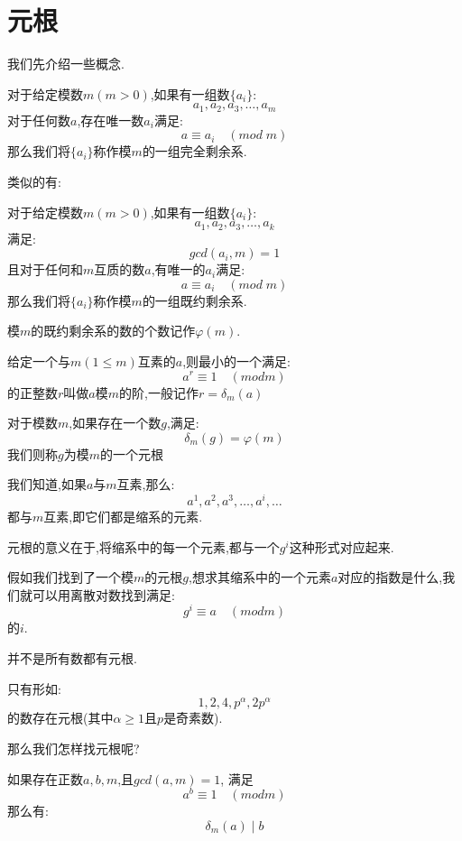 \documentclass[9pt]{beamer}
\begin{document}
	\section{元根}
		\begin{frame}
			我们先介绍一些概念.
			\begin{definition}[剩余系]
				对于给定模数$m(m > 0)$,如果有一组数$\{ a_i\}$:
				$$
					a_1, a_2, a_3,\dots, a_{m}
				$$
				对于任何数$a$,存在唯一数$a_i$满足:
				$$
					a \equiv a_i \quad (mod \; m)
				$$
				那么我们将$\{a_i\}$称作模$m$的一组完全剩余系.
			\end{definition}
			
		\end{frame}
		\begin{frame}
			类似的有:
			\begin{definition}[既约剩余系]
				对于给定模数$m(m > 0)$,如果有一组数$\{ a_i\}$:
				$$
					a_1, a_2, a_3,\dots, a_{k}
				$$
				满足:
				$$
					gcd(a_i,m) = 1
				$$
				且对于任何和$m$互质的数$a$,有唯一的$a_i$满足:
				$$
					a \equiv a_i \quad (mod \; m)
				$$
				那么我们将$\{a_i\}$称作模$m$的一组既约剩余系.
			\end{definition}
			模$m$的既约剩余系的数的个数记作$\varphi(m)$.
		\end{frame}
		\begin{frame}
			\begin{definition}[阶]
				给定一个与$m(1 \leq m)$互素的$a$,则最小的一个满足:
				$$
					a^r \equiv 1 \quad (mod m)
				$$
				的正整数$r$叫做$a$模$m$的阶,一般记作$r = \delta_m(a)$
			\end{definition}
			\begin{definition}[元根] 
				对于模数$m$,如果存在一个数$g$,满足:
				$$
					\delta_m(g) = \varphi(m)
				$$
				我们则称$g$为模$m$的一个元根
			\end{definition}
		\end{frame}
		\begin{frame}
			我们知道,如果$a$与$m$互素,那么:
			$$
				a^1, a^2, a^3,\dots,a^i,\dots
			$$
			都与$m$互素,即它们都是缩系的元素.
			
			元根的意义在于,将缩系中的每一个元素,都与一个$g^i$这种形式对应起来.
			
			假如我们找到了一个模$m$的元根$g$,想求其缩系中的一个元素$a$对应的指数是什么,我们就可以用离散对数找到满足:
			$$
				g^i \equiv a \quad (mod m)
			$$
			的$i$.
		\end{frame}
		\begin{frame}
			并不是所有数都有元根.
			\begin{theorem}
				只有形如:
				$$
				1,2,4,p^{\alpha},2p^{\alpha}
				$$
				的数存在元根(其中$\alpha \geq 1$且$p$是奇素数).
			\end{theorem}
			
			那么我们怎样找元根呢?
			
			\begin{theorem}
				如果存在正数$a,b,m$,且$gcd(a,m) = 1$, 满足
				$$
				a^b \equiv 1 \quad (mod m)
				$$
				那么有:
				$$
				\delta_m(a) \mid b
				$$
			\end{theorem}
			
		\end{frame}
\end{document}

